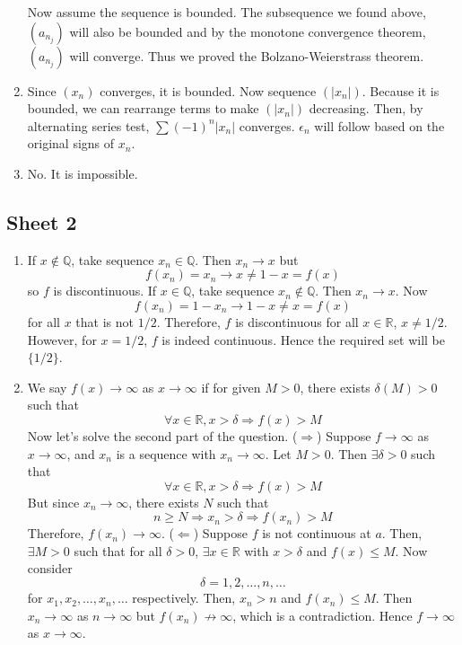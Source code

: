 \documentclass[10pt, a4paper, twoside]{report}
\begin{document}
\begin{enumerate}[{1.}]
    Now assume the sequence is bounded. The subsequence we found above, \((a_{n_j})\) will also be bounded and by the monotone convergence theorem, \((a_{n_j})\) will converge. Thus we proved the Bolzano-Weierstrass theorem.
    \item Since \((x_n)\) converges, it is bounded. Now sequence \((|x_n|)\). Because it is bounded, we can rearrange terms to make \((|x_n|)\) decreasing. Then, by alternating series test, \(\sum (-1)^n|x_n|\) converges. \(\epsilon_n\) will follow based on the original signs of \(x_n\).
    \item No. It is impossible.
\end{enumerate}
\subsection{Sheet 2}
\begin{enumerate}[{1.}]
    \item If \(x\notin\mathbb{Q}\), take sequence \(x_n\in\mathbb{Q}\). Then \(x_n\to x\) but \[f(x_n)=x_n\to x\neq 1-x=f(x)\] so \(f\) is discontinuous. If \(x\in\mathbb{Q}\), take sequence \(x_n\notin\mathbb{Q}\). Then \(x_n\to x\). Now \[f(x_n)=1-x_n\to 1-x\neq x=f(x)\] for all \(x\) that is not \(1/2\). Therefore, \(f\) is discontinuous for all \(x\in\mathbb{R}\), \(x\neq 1/2\). However, for \(x=1/2\), \(f\) is indeed continuous. Hence the required set will be \(\{1/2\}\).
    \item We say \(f(x)\to\infty\) as \(x\to\infty\) if for given \(M>0\), there exists \(\delta(M)>0\) such that 
    \[\forall x\in\mathbb{R}, x>\delta\Rightarrow f(x)>M\]
    Now let's solve the second part of the question. \newline 
    (\(\Rightarrow\)) Suppose \(f\to\infty\) as \(x\to\infty\), and \(x_n\) is a sequence with \(x_n\to\infty\). Let \(M>0\). Then \(\exists\delta>0\) such that 
    \[\forall x\in\mathbb{R},x>\delta\Rightarrow f(x)>M\]
    But since \(x_n\to\infty\), there exists \(N\) such that 
    \[n\geq N\Rightarrow x_n>\delta\Rightarrow f(x_n)>M\]
    Therefore, \(f(x_n)\to\infty\). \newline 
    (\(\Leftarrow\)) Suppose \(f\) is not continuous at \(a\). Then, \(\exists M>0\) such that for all \(\delta>0\), \(\exists x\in\mathbb{R}\) with \(x>\delta\) and \(f(x)\leq M\). Now consider 
    \[\delta=1,2,\ldots,n,\ldots\]
    for \(x_1,x_2,\ldots,x_n,\ldots\) respectively. Then, \(x_n>n\) and \(f(x_n)\leq M\). Then \(x_n\to\infty\) as \(n\to\infty\) but \(f(x_n)\nrightarrow\infty\), which is a contradiction. Hence \(f\to\infty\) as \(x\to\infty\).

\end{enumerate}
\end{document}
